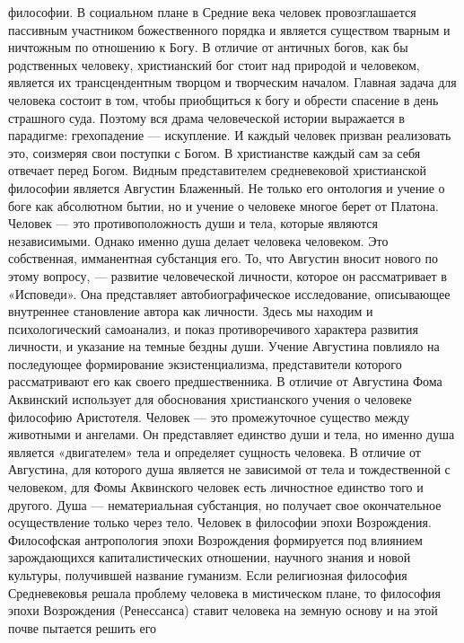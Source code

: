 \documentclass[12pt]{article}
\begin{document}
философии.
В социальном плане в Средние века человек провозглашается пассивным участником божественного порядка и
является  существом  тварным  и  ничтожным  по  отношению  к  Богу.  В  отличие  от  античных  богов,  как  бы
родственных  человеку,  христианский  бог  стоит  над  природой  и  человеком,  является  их  трансцендентным
творцом и творческим началом. Главная задача для человека состоит в том, чтобы приобщиться к богу и
обрести спасение в день страшного суда. Поэтому вся драма человеческой истории выражается в парадигме:
грехопадение — искупление. И каждый человек призван реализовать это, соизмеряя свои поступки с Богом. В
христианстве каждый сам за себя отвечает перед Богом.
Видным представителем средневековой христианской философии является Августин Блаженный. Не только его
онтология и учение о боге как абсолютном бытии, но и учение о человеке многое берет от Платона. Человек —
это противоположность души и тела, которые являются независимыми. Однако именно душа делает человека
человеком. Это собственная, имманентная субстанция его. То, что Августин вносит нового по этому вопросу, —
развитие  человеческой  личности,  которое  он  рассматривает  в  «Исповеди».  Она  представляет
автобиографическое  исследование,  описывающее  внутреннее  становление  автора  как  личности.  Здесь  мы
находим и психологический самоанализ, и показ противоречивого характера развития личности, и указание на
темные  бездны  души.  Учение  Августина  повлияло  на  последующее  формирование  экзистенциализма,
представители которого рассматривают его как своего предшественника.
В  отличие  от  Августина  Фома  Аквинский  использует  для  обоснования  христианского  учения  о  человеке
философию  Аристотеля.  Человек  —  это  промежуточное  существо  между  животными  и  ангелами.  Он
представляет  единство  души  и  тела,  но  именно  душа  является  «двигателем»  тела  и  определяет  сущность
человека.  В  отличие  от  Августина,  для  которого  душа  является  не  зависимой  от  тела  и  тождественной  с
человеком, для Фомы Аквинского человек есть личностное единство того и другого. Душа — нематериальная
субстанция, но получает свое окончательное осуществление только через тело.
Человек в философии эпохи Возрождения.
Философская антропология эпохи Возрождения формируется под влиянием зарождающихся капиталистических
отношении, научного знания и новой культуры, получившей название гуманизм.
Если религиозная философия Средневековья решала проблему человека в мистическом плане, то философия
эпохи Возрождения (Ренессанса) ставит человека на земную основу и на этой почве пытается решить его
\end{document}
